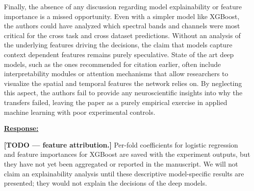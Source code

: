 \documentclass{article}
\begin{document}
\begin{cmt}{}{}

Finally, the absence of any discussion regarding model explainability or feature
importance is a missed opportunity. Even with a simpler model like XGBoost, the
authors could have analyzed which spectral bands and channels were most critical
for the cross task and cross dataset predictions. Without an analysis of the
underlying features driving the decisions, the claim that models capture context
dependent features remains purely speculative. State of the art deep models,
such as the ones recommended for citation earlier, often include interpretability
modules or attention mechanisms that allow researchers to visualize the spatial
and temporal features the network relies on. By neglecting this aspect, the
authors fail to provide any neuroscientific insights into why the transfers
failed, leaving the paper as a purely empirical exercise in applied machine
learning with poor experimental controls.

\end{cmt}
\vspace{0.1cm}
\noindent
\underline{\textbf{Response:}}
\vspace{0.2cm}

\textbf{[TODO --- feature attribution.]}
Per-fold coefficients for logistic regression and feature importances for
XGBoost are saved with the experiment outputs, but they have not yet been
aggregated or reported in the manuscript. We will not claim an explainability
analysis until these descriptive model-specific results are presented; they would
not explain the decisions of the deep models.

\vspace{0.3cm}
\end{document}
